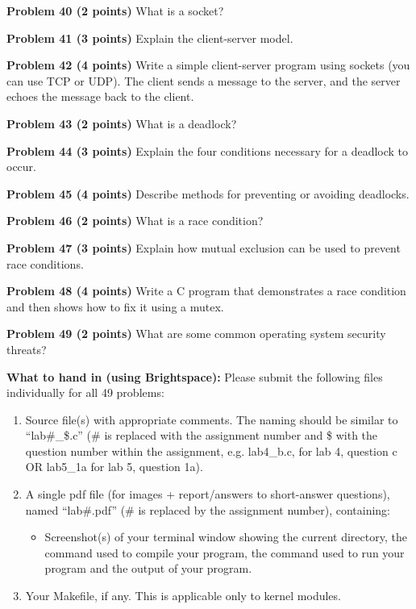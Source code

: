 \documentclass{article}
\begin{document}
\textbf{Problem 40 (2 points)} What is a socket?


\textbf{Problem 41 (3 points)} Explain the client-server model.


\textbf{Problem 42 (4 points)} Write a simple client-server program using sockets (you can use TCP or UDP). The client sends a message to the server, and the server echoes the message back to the client.


\textbf{Problem 43 (2 points)} What is a deadlock?


\textbf{Problem 44 (3 points)} Explain the four conditions necessary for a deadlock to occur.


\textbf{Problem 45 (4 points)} Describe methods for preventing or avoiding deadlocks.


\textbf{Problem 46 (2 points)} What is a race condition?


\textbf{Problem 47 (3 points)} Explain how mutual exclusion can be used to prevent race conditions.


\textbf{Problem 48 (4 points)}  Write a C program that demonstrates a race condition and then shows how to fix it using a mutex.


\textbf{Problem 49 (2 points)} What are some common operating system security threats?


\textbf{What to hand in (using Brightspace):}
Please submit the following files individually for all 49 problems:
\begin{enumerate}
    \item Source file(s) with appropriate comments. The naming should be similar to “lab\#\_\$.c” (\# is replaced with the assignment number and \$ with the question number within the assignment, e.g. lab4\_b.c, for lab 4, question c OR lab5\_1a for lab 5, question 1a).
    \item A single pdf file (for images + report/answers to short-answer questions), named “lab\#.pdf” (\# is replaced by the assignment number), containing:
    \begin{itemize}
        \item Screenshot(s) of your terminal window showing the current directory, the command used to compile your program, the command used to run your program and the output of your program.
    \end{itemize}
    \item Your Makefile, if any. This is applicable only to kernel modules.
\end{enumerate}
\end{document}
